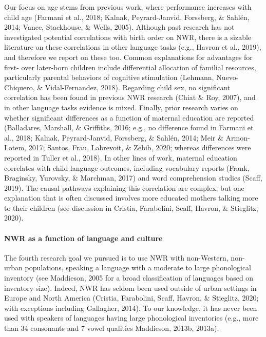 \documentclass[
  american,
  ,man,floatsintext]{apa6}
\let\oldparagraph\paragraph
\renewcommand{\paragraph}[1]{\oldparagraph{#1}\mbox{}}
\begin{document}
Our focus on age stems from previous work, where performance increases with child age (Farmani et al., 2018; Kalnak, Peyrard-Janvid, Forssberg, \& Sahlén, 2014; Vance, Stackhouse, \& Wells, 2005). Although past research has not investigated potential correlations with birth order on NWR, there is a sizable literature on these correlations in other language tasks (e.g., Havron et al., 2019), and therefore we report on these too. Common explanations for advantages for first- over later-born children include differential allocation of familial resources, particularly parental behaviors of cognitive stimulation (Lehmann, Nuevo-Chiquero, \& Vidal-Fernandez, 2018). Regarding child sex, no significant correlation has been found in previous NWR research (Chiat \& Roy, 2007), and in other language tasks evidence is mixed. Finally, prior research varies on whether significant differences as a function of maternal education are reported (Balladares, Marshall, \& Griffiths, 2016; e.g., no difference found in Farmani et al., 2018; Kalnak, Peyrard-Janvid, Forssberg, \& Sahlén, 2014; Meir \& Armon-Lotem, 2017; Santos, Frau, Labrevoit, \& Zebib, 2020; whereas differences were reported in Tuller et al., 2018). In other lines of work, maternal education correlates with child language outcomes, including vocabulary reports (Frank, Braginsky, Yurovsky, \& Marchman, 2017) and word comprehension studies (Scaff, 2019). The causal pathways explaining this correlation are complex, but one explanation that is often discussed involves more educated mothers talking more to their children (see discussion in Cristia, Farabolini, Scaff, Havron, \& Stieglitz, 2020).

\hypertarget{nwr-as-a-function-of-language-and-culture}{%
\paragraph{NWR as a function of language and culture}\label{nwr-as-a-function-of-language-and-culture}}

The fourth research goal we pursued is to use NWR with non-Western, non-urban populations, speaking a language with a moderate to large phonological inventory (see Maddieson, 2005 for a broad classification of languages based on inventory size). Indeed, NWR has seldom been used outside of urban settings in Europe and North America (Cristia, Farabolini, Scaff, Havron, \& Stieglitz, 2020; with exceptions including Gallagher, 2014). To our knowledge, it has never been used with speakers of languages having large phonological inventories (e.g., more than 34 consonants and 7 vowel qualities Maddieson, 2013b, 2013a).
\end{document}
